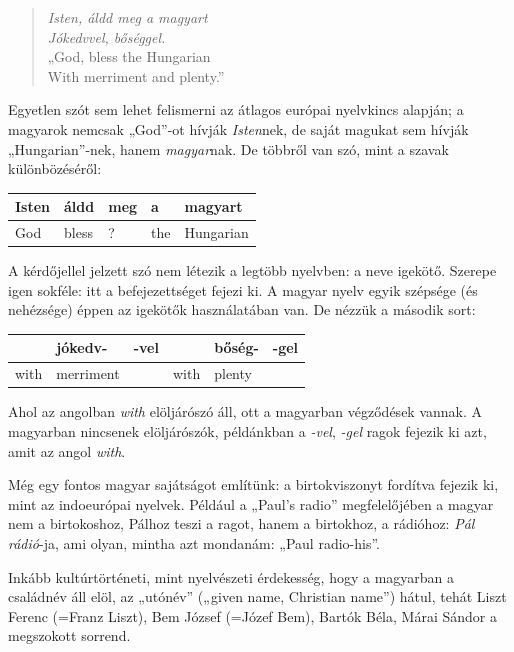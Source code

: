 \begin{multicols}{2}
\begin{verse}
\textit{Isten, áldd meg a magyart}\\
\textit{Jókedvvel, bőséggel.}\\
„God, bless the Hungarian\\
With merriment and plenty.”
\end{verse}

Egyetlen szót sem lehet felismerni az átlagos európai nyelvkincs alapján; a magyarok nemcsak „God”-ot hívják \textit{Isten}nek, de saját magukat sem hívják „Hungarian”-nek, hanem \textit{magyar}nak. De többről van szó, mint a szavak különbözéséről:

\vspace{3mm}

\begin{tabular}{l|l|l|l|l}
    Isten & áldd & meg & a & magyart\\
    \hline
    God & bless & ? & the & Hungarian\\
  \end{tabular}

\vspace{3mm}   

A kérdőjellel jelzett szó nem létezik a legtöbb nyelvben: a neve igekötő. Szerepe igen sokféle: itt a befejezettséget fejezi ki. A magyar nyelv egyik szépsége (és nehézsége) éppen az igekötők használatában van. De nézzük a második sort:

\vspace{3mm}

\begin{tabular}{l|l|l|l|l|l}
    & jókedv- & -vel & & bőség- & -gel\\
    \hline
    with & merriment & & with & plenty & \\
  \end{tabular}

\vspace{3mm}  

Ahol az angolban \textit{with} elöljárószó áll, ott a ma\-gyar\-ban végződések vannak. A ma\-gyar\-ban nincsenek elöljárószók, pél\-dánk\-ban a \textit{-vel}, \textit{-gel} ragok fejezik ki azt, amit az angol \textit{with}.

Még egy fontos magyar sajátságot említünk: a birtokviszonyt for\-dít\-va fejezik ki, mint az indoeurópai nyelvek. Például a „Paul's radio” meg\-fe\-le\-lő\-jé\-ben a magyar nem a birtokoshoz, Pálhoz teszi a ragot, hanem a birtokhoz, a rádióhoz: \textit{Pál rádió}-ja, ami olyan, mintha azt mondanám: „Paul radio-his”.

Inkább kultúrtörténeti, mint nyelvészeti érdekesség, hogy a magyarban a családnév áll elöl, az „utónév” („given name, Christian name”) hátul, tehát Liszt Ferenc (=Franz Liszt), Bem József (=Józef Bem), Bartók Béla, Márai Sándor a megszokott sorrend.


\end{multicols}
